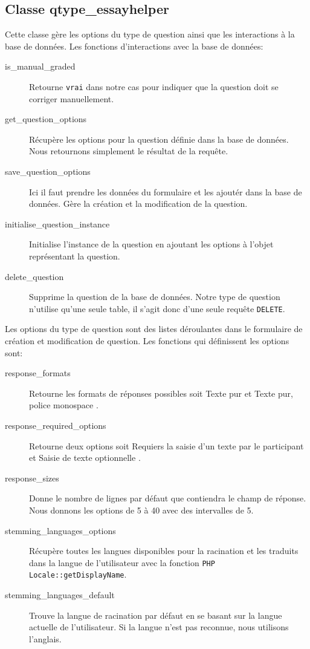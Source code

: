 \subsection*{Classe qtype\_essayhelper}
Cette classe g\`ere les options du type de question ainsi que les interactions \`a la base de donn\'ees.
Les fonctions d'interactions avec la base de donn\'ees:
\begin{description}
  \item[is\_manual\_graded] Retourne \texttt{vrai} dans notre cas pour indiquer que la question doit se corriger manuellement.
  \item[get\_question\_options] R\'ecup\`ere les options pour la question d\'efinie dans la base de donn\'ees. Nous retournons simplement le r\'esultat de la requ\^ete.
  \item[save\_question\_options] Ici il faut prendre les donn\'ees du formulaire et les ajout\'er dans la base de donn\'ees. G\`ere la cr\'eation et la modification de la question.
  \item[initialise\_question\_instance] Initialise l'instance de la question en ajoutant les options \`a l'objet repr\'esentant la question.
  \item[delete\_question] Supprime la question de la base de donn\'ees. Notre type de question n'utilise qu'une seule table, il s'agit donc d'une seule requ\^ete \texttt{DELETE}.
\end{description}
Les options du type de question sont des listes d\'eroulantes dans le formulaire de cr\'eation et modification de question.
Les fonctions qui d\'efinissent les options sont:
\begin{description}
  \item[response\_formats] Retourne les formats de r\'eponses possibles soit \og Texte pur \fg{} et \og Texte pur, police monospace \fg{} .
  \item[response\_required\_options] Retourne deux options soit \og Requiers la saisie d'un texte par le participant \fg{} et \og Saisie de texte optionnelle \fg{}.
  \item[response\_sizes] Donne le nombre de lignes par d\'efaut que contiendra le champ de r\'eponse. Nous donnons les options de 5 \`a 40 avec des intervalles de 5.
  \item[stemming\_languages\_options] R\'ecup\`ere toutes les langues disponibles pour la racination et les traduits dans la langue de l'utilisateur avec la fonction \texttt{PHP Locale::getDisplayName}.
  \item[stemming\_languages\_default] Trouve la langue de racination par d\'efaut en se basant sur la langue actuelle de l'utilisateur. Si la langue n'est pas reconnue, nous utilisons l'anglais.
\end{description}
